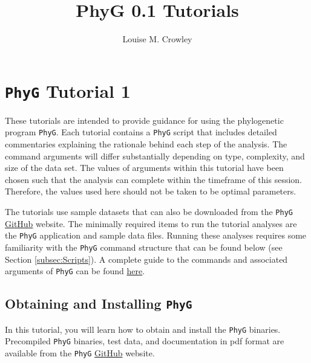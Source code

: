 \documentclass[]{article}
\title{PhyG 0.1 Tutorials}
\author{Louise M. Crowley}
\newcommand{\phyg}{\texttt{PhyG} }
\begin{document}
\maketitle

\pagestyle{fancy}


\section{\phyg Tutorial 1}

These tutorials are intended to provide guidance for using the phylogenetic 
program \texttt{PhyG}. Each tutorial contains a \phyg script that includes 
detailed commentaries explaining the rationale behind each step of the analysis. 
The command arguments will differ substantially depending on type, complexity, 
and size of the data set. The values of arguments within this tutorial have been 
chosen such that the analysis can complete within the timeframe of this session.
Therefore, the values used here should not be taken to be optimal parameters. 

The tutorials use sample datasets that can also be downloaded from the \texttt{PhyG} 
\href{https://github.com/amnh/PhyGraph}{GitHub} website. The minimally required 
items to run the tutorial analyses are the \phyg application and sample data files. 
Running these analyses requires some familiarity with the \phyg command structure 
that can be found below (see Section \ref{subsec:Scripts}). A complete guide to the
commands and associated arguments of \phyg can be found 
\href{https://github.com/amnh/PhyGraph}{here}.

\subsection{Obtaining and Installing \phyg}
\label{subsec:Installation}

In this tutorial, you will learn how to obtain and install the \phyg binaries.  
Precompiled \phyg binaries, test data, and documentation in pdf format are available 
from the \phyg \href{https://github.com/amnh/PhyGraph}{GitHub} website. 
\end{document}
